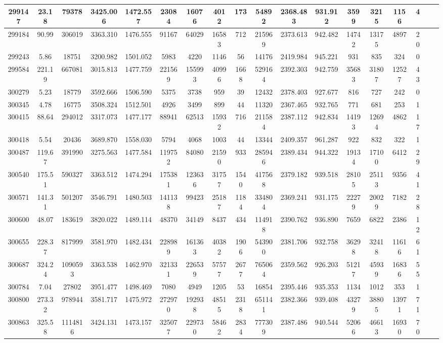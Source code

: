 \documentclass[10pt]{extarticle}
\begin{document}
\begin{longtable}{|c|c|c|c|c|c|c|c|c|c|c|c|c|c|c|c|c|c|}
\hline 
299147&23.18&79378&3425.006&1472.557&23084&16076&4012&173&54892&2368.483&931.912&3599&3215&1156&4 \\ 
\hline 
299184&90.99&306019&3363.310&1476.555&91167&64029&16583&712&215969&2373.613&942.482&14742&13175&4897&20 \\ 
\hline 
299243&5.86&18751&3200.982&1501.052&5983&4220&1146&56&14176&2419.984&945.221&931&835&324&0 \\ 
\hline 
299584&221.19&667081&3015.813&1477.759&221569&155993&40996&1668&529164&2392.303&942.759&35683&31807&12527&43 \\ 
\hline 
300279&5.23&18779&3592.666&1506.590&5375&3738&959&39&12432&2378.403&927.677&816&727&242&0 \\ 
\hline 
300345&4.78&16775&3508.324&1512.501&4926&3499&899&44&11320&2367.465&932.765&771&681&253&1 \\ 
\hline 
300415&88.64&294012&3317.073&1477.177&88941&62513&15932&716&211584&2387.112&942.834&14193&12694&4862&17 \\ 
\hline 
300418&5.54&20436&3689.870&1558.030&5794&4068&1003&44&13344&2409.357&961.287&922&832&322&1 \\ 
\hline 
300487&119.67&391990&3275.563&1477.584&119752&84080&21590&933&285946&2389.434&944.322&19134&17100&6412&29 \\ 
\hline 
300540&175.51&590327&3363.512&1474.294&175381&123636&31757&1540&417568&2379.182&939.518&28105&25113&9356&41 \\ 
\hline 
300571&141.31&501207&3546.791&1480.503&141138&99423&25187&1184&334804&2369.241&931.175&22279&20029&7182&28 \\ 
\hline 
300600&48.07&183619&3820.022&1489.114&48370&34149&8437&434&114918&2390.762&936.890&7659&6822&2386&12 \\ 
\hline 
300655&228.37&817999&3581.970&1482.434&228989&161363&40382&1906&543900&2381.706&932.758&36298&32418&11616&61 \\ 
\hline 
300687&324.24&1090593&3363.538&1462.970&321331&226539&57577&2677&765064&2359.562&926.203&51217&45939&16836&55 \\ 
\hline 
300784&7.04&27802&3951.477&1498.469&7080&4949&1205&53&16854&2395.446&935.353&1134&1012&353&1 \\ 
\hline 
300800&273.32&978944&3581.717&1475.972&272970&192938&48515&2318&651141&2382.366&939.408&43279&38805&13971&71 \\ 
\hline 
300863&325.58&1114816&3424.131&1473.157&325077&229730&58462&2834&777309&2387.486&940.544&52066&46613&16930&70 \\ 

\end{longtable}
\end{document}
